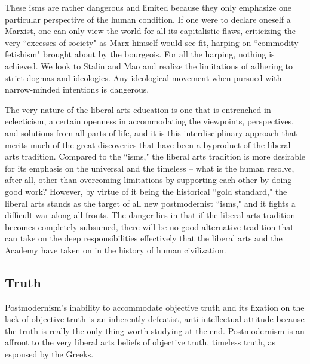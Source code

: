 \documentclass[12pt,letterpaper]{article}
\begin{document}
 These isms are rather dangerous and limited because they only emphasize one particular perspective of the human condition. If one were to declare oneself a Marxist, one can only view the world for all its capitalistic flaws, criticizing the very ``excesses of society" as Marx himself would see fit, harping on ``commodity fetishism" brought about by the bourgeois.  For all the harping, nothing is achieved.  We look to Stalin and Mao and realize the limitations of adhering to strict dogmas and ideologies.  Any ideological movement when pursued with narrow-minded intentions is dangerous.

The very nature of the liberal arts education is one that is entrenched in eclecticism, a certain openness in accommodating the viewpoints, perspectives, and solutions from all parts of life, and it is this interdisciplinary approach that merits much of the great discoveries that have been a byproduct of the liberal arts tradition.  Compared to the ``isms," the liberal arts tradition is more desirable for its emphasis on the universal and the timeless -- what is the human resolve, after all, other than overcoming limitations by supporting each other by doing good work? However, by virtue of it being the historical ``gold standard," the liberal arts stands as the target of all new postmodernist ``isms," and it fights a difficult war along all fronts.  The danger lies in that if the liberal arts tradition becomes completely subsumed, there will be no good alternative tradition that can take on the deep responsibilities effectively that the liberal arts and the Academy have taken on in the history of human civilization.



\subsection{Truth}
Postmodernism's inability to accommodate objective truth and its fixation on the lack of objective truth is an inherently defeatist, anti-intellectual attitude because the truth is really the only thing worth studying at the end.  Postmodernism is an affront to the very liberal arts beliefs of objective truth, timeless truth, as espoused by the Greeks. 
\end{document}
